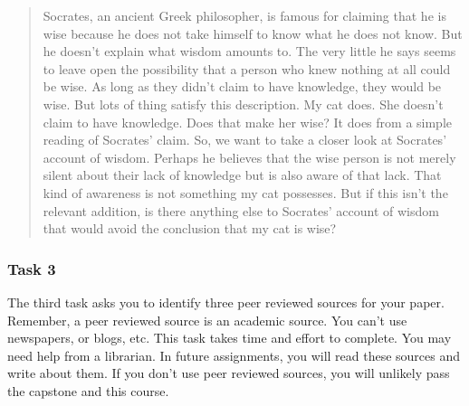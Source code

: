 \documentclass[]{article}
\begin{document}
\begin{quote}
Socrates, an ancient Greek philosopher, is famous for claiming that he
is wise because he does not take himself to know what he does not know.
But he doesn't explain what wisdom amounts to. The very little he says
seems to leave open the possibility that a person who knew nothing at
all could be wise. As long as they didn't claim to have knowledge, they
would be wise. But lots of thing satisfy this description. My cat does.
She doesn't claim to have knowledge. Does that make her wise? It does
from a simple reading of Socrates' claim. So, we want to take a closer
look at Socrates' account of wisdom. Perhaps he believes that the wise
person is not merely silent about their lack of knowledge but is also
aware of that lack. That kind of awareness is not something my cat
possesses. But if this isn't the relevant addition, is there anything
else to Socrates' account of wisdom that would avoid the conclusion that
my cat is wise?
\end{quote}

\hypertarget{task-3}{%
\subsubsection{Task 3}\label{task-3}}

The third task asks you to identify three peer reviewed sources for your
paper. Remember, a peer reviewed source is an academic source. You can't
use newspapers, or blogs, etc. This task takes time and effort to complete.
You may need help from a librarian. In future assignments, you will read
these sources and write about them. If you don't use peer reviewed
sources, you will unlikely pass the capstone and this course.
\end{document}
